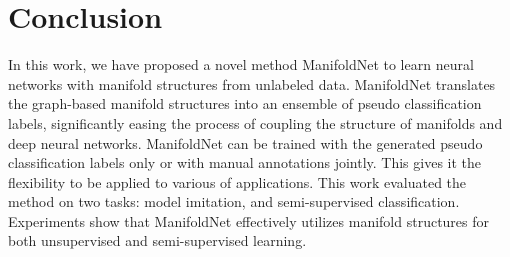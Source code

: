 \documentclass{bmvc2k}
\newcommand{\todo}[1]{\textcolor{red}{#1}}
\begin{document}

\section{Conclusion}
\label{sec:conclusion}
In this work, we have proposed a novel method ManifoldNet to learn
neural networks with manifold structures from unlabeled data.
ManifoldNet translates the graph-based manifold structures into an
ensemble of pseudo classification labels, significantly easing the
process of coupling the structure of manifolds and deep neural
networks. ManifoldNet can be trained with the generated pseudo
classification labels only or with manual annotations jointly.  This
gives it the flexibility to be applied to various of applications. This
work evaluated the method on two tasks: model imitation, and semi-supervised classification. Experiments show that ManifoldNet effectively utilizes manifold structures for both unsupervised and semi-supervised learning. 

{\small


}
\end{document}
